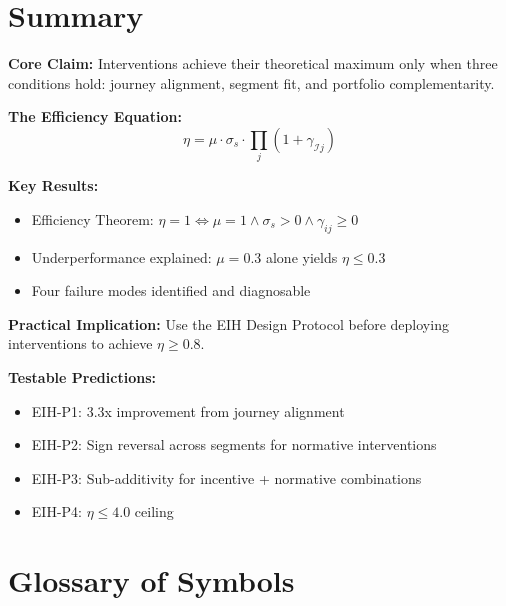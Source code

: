 \section{Summary}
\label{sec:eih-summary}

\begin{tcolorbox}[colback=green!10!white, colframe=green!75!black,
    title=\textbf{Appendix III Summary: The Efficient Intervention Hypothesis}]

\textbf{Core Claim:}
Interventions achieve their theoretical maximum only when three conditions hold:
journey alignment, segment fit, and portfolio complementarity.

\textbf{The Efficiency Equation:}
\begin{equation*}
\eta = \mu \cdot \sigma_s \cdot \prod_j (1 + \gamma_{\mathcal{I}j})
\end{equation*}

\textbf{Key Results:}
\begin{itemize}[nosep]
\item Efficiency Theorem: $\eta = 1 \Leftrightarrow \mu = 1 \land \sigma_s > 0 \land \gamma_{ij} \geq 0$
\item Underperformance explained: $\mu = 0.3$ alone yields $\eta \leq 0.3$
\item Four failure modes identified and diagnosable
\end{itemize}

\textbf{Practical Implication:}
Use the EIH Design Protocol before deploying interventions to achieve $\eta \geq 0.8$.

\textbf{Testable Predictions:}
\begin{itemize}[nosep]
\item EIH-P1: 3.3x improvement from journey alignment
\item EIH-P2: Sign reversal across segments for normative interventions
\item EIH-P3: Sub-additivity for incentive + normative combinations
\item EIH-P4: $\eta \leq 4.0$ ceiling
\end{itemize}

\end{tcolorbox}


\section{Glossary of Symbols}
\label{sec:eih-glossary}

